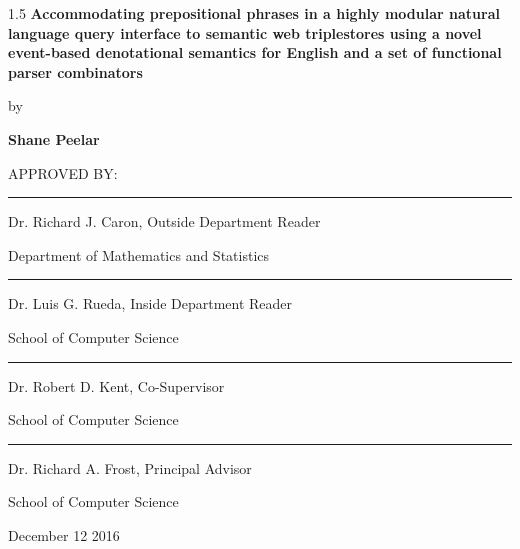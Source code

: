 \documentclass[fleqn, oneside, 12pt]{book}
\theoremstyle{definitionsty}
\newcommand{\uwinonehalfspacelen}{1.5}
\newenvironment{uwinonehalfspaceenv}%
{\begin{spacing}{\uwinonehalfspacelen}}%
	{\end{spacing}}
\begin{document}
\begin{center}
	\begin{uwinonehalfspaceenv}
		\Large\textbf{Accommodating prepositional phrases in a highly modular
			natural language query interface to semantic web triplestores using a novel event-based denotational semantics for English and a set of functional parser combinators}
	\end{uwinonehalfspaceenv}
	
	by
	\vspace{0.7071cm}
	
	{\Large\textbf{Shane Peelar}}
	
	\vspace{0.5in}
	
	APPROVED BY:
	
	\vspace{0.5in}
	
	\noindent\rule{4in}{0.4pt}
	
	Dr. Richard J. Caron, Outside Department Reader
	
	Department of Mathematics and Statistics
	
	\vspace{0.5in}
	
	\noindent\rule{4in}{0.4pt}
	
	Dr. Luis G. Rueda, Inside Department Reader
	
	School of Computer Science
	
	\vspace{0.5in}

	\noindent\rule{4in}{0.4pt}
	
	Dr. Robert D. Kent, Co-Supervisor
	
	School of Computer Science
	
	\vspace{0.5in}
	
	\noindent\rule{4in}{0.4pt}
	
	Dr. Richard A. Frost, Principal Advisor
	
	School of Computer Science
	
\end{center}

\vspace*{\fill}

\hspace*{\fill}December 12 2016

\end{document}
